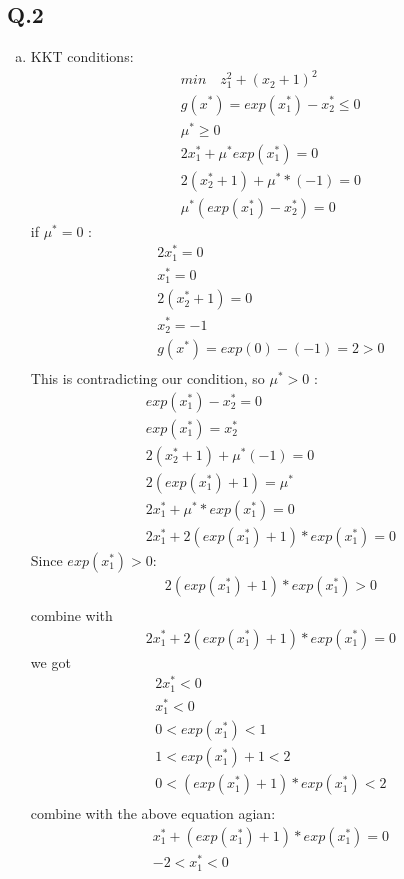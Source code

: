 \documentclass[12pt,twoside]{article}
\begin{document}
\subsection{Q.2}
\begin{enumerate}[a)]
\item
KKT conditions:
\begin{align}
min \quad z_1^2 + (x_2 + 1)^2\\
g(x^*) = exp(x_1^*) - x_2^* \leq 0\\
\mu^* \geq 0\\
2x_1^* + \mu^* exp(x_1^*) = 0\\
2(x_2^* + 1) + \mu^* * (-1) = 0\\
\mu^* (exp(x_1^*) - x_2^*) = 0
\end{align}
if $\mu^* = 0$ :
\begin{align}
2 x_1^* = 0\\
x_1^* = 0\\
2(x_2^* + 1) = 0\\
x_2^* = -1\\
g(x^*) = exp(0) - (-1) = 2 > 0\\
\end{align}
This is contradicting our condition, so $\mu^* > 0$ :
\begin{align}
exp(x_1^*) - x_2^* = 0\\
exp(x_1^*) =  x_2^*\\
2(x_2^* + 1) + \mu^* (-1) = 0\\
2(exp(x_1^*) + 1) = \mu^*\\
2x_1^* + \mu^* * exp(x_1^*) = 0\\
2x_1^* + 2(exp(x_1^*) + 1) * exp(x_1^*) = 0
\end{align}
Since $exp(x_1^*) > 0$:
\begin{align}
2(exp(x_1^*) + 1) * exp(x_1^*) > 0\\
\end{align}
combine with
\begin{align}
2x_1^* + 2(exp(x_1^*) + 1) * exp(x_1^*) = 0
\end{align}
we got
\begin{align}
2x_1^* < 0\\
x_1^* < 0\\
0 < exp(x_1^*) < 1\\
1 < exp(x_1^*) + 1 < 2\\
0 < (exp(x_1^*) + 1) * exp(x_1^*) < 2\\
\end{align}                                               
combine with the above equation agian:
\begin{align}
x_1^* + (exp(x_1^*) + 1) * exp(x_1^*) = 0\\
-2 < x_1^* < 0
\end{align}



\end{enumerate}
\end{document}
